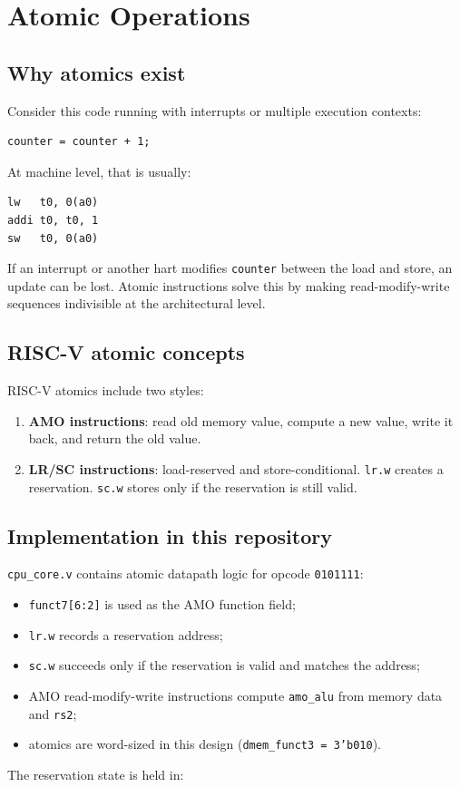 \section{Atomic Operations}

\subsection{Why atomics exist}

Consider this code running with interrupts or multiple execution contexts:

\begin{lstlisting}[language={}]
counter = counter + 1;
\end{lstlisting}

At machine level, that is usually:

\begin{lstlisting}[language={}]
lw   t0, 0(a0)
addi t0, t0, 1
sw   t0, 0(a0)
\end{lstlisting}

If an interrupt or another hart modifies \texttt{counter} between the load and store, an update can be lost. Atomic instructions solve this by making read-modify-write sequences indivisible at the architectural level.

\subsection{RISC-V atomic concepts}

RISC-V atomics include two styles:

\begin{enumerate}
\item \textbf{AMO instructions}: read old memory value, compute a new value, write it back, and return the old value.
\item \textbf{LR/SC instructions}: load-reserved and store-conditional. \texttt{lr.w} creates a reservation. \texttt{sc.w} stores only if the reservation is still valid.
\end{enumerate}

\subsection{Implementation in this repository}

\texttt{cpu\_core.v} contains atomic datapath logic for opcode \texttt{0101111}:

\begin{itemize}
\item \texttt{funct7[6:2]} is used as the AMO function field;
\item \texttt{lr.w} records a reservation address;
\item \texttt{sc.w} succeeds only if the reservation is valid and matches the address;
\item AMO read-modify-write instructions compute \texttt{amo\_alu} from memory data and \texttt{rs2};
\item atomics are word-sized in this design (\texttt{dmem\_funct3 = 3'b010}).
\end{itemize}
The reservation state is held in:

